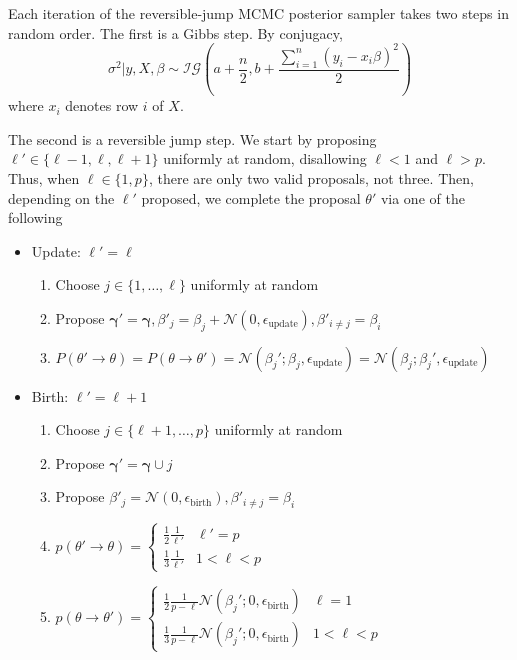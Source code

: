 \documentclass{article}
\begin{document}
Each iteration of the reversible-jump MCMC posterior sampler takes two steps in random order. The first is a Gibbs step. By conjugacy,
\begin{equation}
    \sigma^{2} | y, X, \beta \sim \mathcal{IG}\left(a + \frac{n}{2}, b + \frac{\sum_{i=1}^{n}(y_{i}-x_{i}\beta)^{2} }{2}\right)
\end{equation}
where $x_{i}$ denotes row $i$ of $X$.

The second is a reversible jump step. We start by proposing $\ell' \in \{\ell-1, \ell, \ell+1\}$ uniformly at random, disallowing $\ell<1$ and $\ell>p$. Thus, when $\ell \in \{1,p\}$, there are only two valid proposals, not three. Then, depending on the $\ell'$ proposed, we complete the proposal $\theta'$ via one of the following
\begin{itemize}
    \item Update: $\ell' = \ell$
    \begin{enumerate}
        \item Choose $j \in \{1, \ldots, \ell\}$ uniformly at random
        \item Propose $\mathbf{\gamma}' = \mathbf{\gamma}, \beta'_{j} = \beta_{j} + \mathcal{N}(0, \epsilon_{\text{update}}), \beta'_{i \neq j} = \beta_{i}$
        \item $P(\theta' \rightarrow \theta) = P(\theta \rightarrow \theta')=\mathcal{N}(\beta_{j}'; \beta_{j},\epsilon_{\text{update}})=\mathcal{N}(\beta_{j}; \beta_{j}',\epsilon_{\text{update}})$
    \end{enumerate}
\end{itemize}

\begin{itemize}
    \item Birth: $\ell' = \ell+1$
    \begin{enumerate}
        \item Choose $j \in \{\ell+1, \ldots, p\}$ uniformly at random
        \item Propose $\mathbf{\gamma}' = \mathbf{\gamma} \cup j$
        \item Propose $\beta'_{j} = \mathcal{N}(0, \epsilon_{\text{birth}}), \beta'_{i \neq j} = \beta_{i}$
        \item $p(\theta' \rightarrow \theta) = \begin{cases}\frac{1}{2}\frac{1}{\ell'} & \ell'=p \\ \frac{1}{3} \frac{1}{\ell'} & 1<\ell<p \end{cases} $
        \item $p(\theta \rightarrow \theta') = \begin{cases}\frac{1}{2}\frac{1}{p-\ell} \mathcal{N}(\beta_{j}'; 0,\epsilon_{\text{birth}}) & \ell=1 \\ \frac{1}{3} \frac{1}{p-\ell} \mathcal{N}(\beta_{j}'; 0,\epsilon_{\text{birth}}) & 1<\ell<p \end{cases} $
    \end{enumerate}
\end{itemize}
\end{document}
